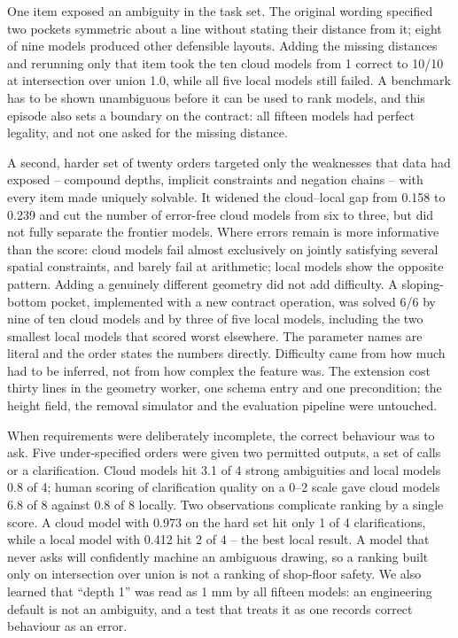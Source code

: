 One item exposed an ambiguity in the task set. The original wording specified two pockets symmetric about a line without stating their distance from it; eight of nine models produced other defensible layouts. Adding the missing distances and rerunning only that item took the ten cloud models from 1 correct to 10/10 at intersection over union 1.0, while all five local models still failed. A benchmark has to be shown unambiguous before it can be used to rank models, and this episode also sets a boundary on the contract: all fifteen models had perfect legality, and not one asked for the missing distance.

A second, harder set of twenty orders targeted only the weaknesses that data had exposed -- compound depths, implicit constraints and negation chains -- with every item made uniquely solvable. It widened the cloud--local gap from 0.158 to 0.239 and cut the number of error-free cloud models from six to three, but did not fully separate the frontier models. Where errors remain is more informative than the score: cloud models fail almost exclusively on jointly satisfying several spatial constraints, and barely fail at arithmetic; local models show the opposite pattern. Adding a genuinely different geometry did not add difficulty. A sloping-bottom pocket, implemented with a new contract operation, was solved 6/6 by nine of ten cloud models and by three of five local models, including the two smallest local models that scored worst elsewhere. The parameter names are literal and the order states the numbers directly. Difficulty came from how much had to be inferred, not from how complex the feature was. The extension cost thirty lines in the geometry worker, one schema entry and one precondition; the height field, the removal simulator and the evaluation pipeline were untouched.

When requirements were deliberately incomplete, the correct behaviour was to ask. Five under-specified orders were given two permitted outputs, a set of calls or a clarification. Cloud models hit 3.1 of 4 strong ambiguities and local models 0.8 of 4; human scoring of clarification quality on a 0--2 scale gave cloud models 6.8 of 8 against 0.8 of 8 locally. Two observations complicate ranking by a single score. A cloud model with 0.973 on the hard set hit only 1 of 4 clarifications, while a local model with 0.412 hit 2 of 4 -- the best local result. A model that never asks will confidently machine an ambiguous drawing, so a ranking built only on intersection over union is not a ranking of shop-floor safety. We also learned that ``depth 1'' was read as 1 mm by all fifteen models: an engineering default is not an ambiguity, and a test that treats it as one records correct behaviour as an error.

